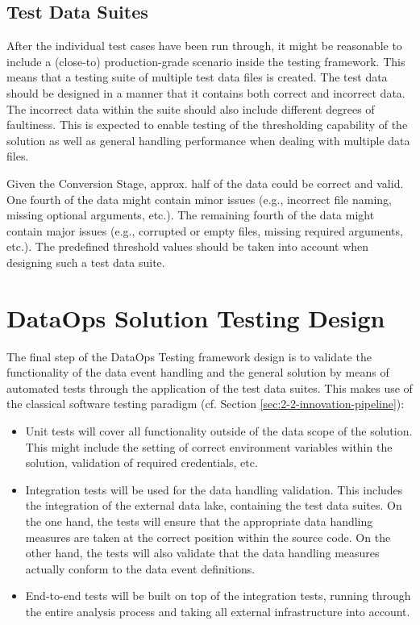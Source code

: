 \subsection{Test Data Suites} \label{sec:4-test-suites}
After the individual test cases have been run through, it might be reasonable to include a (close-to) production-grade scenario inside the testing framework. This means that a testing suite of multiple test data files is created. The test data should be designed in a manner that it contains both correct and incorrect data. The incorrect data within the suite should also include different degrees of faultiness. This is expected to enable testing of the thresholding capability of the solution as well as general handling performance when dealing with multiple data files.

Given the Conversion Stage, approx. half of the data could be correct and valid. One fourth of the data might contain minor issues (e.g., incorrect file naming, missing optional arguments, etc.). The remaining fourth of the data might contain major issues (e.g., corrupted or empty files, missing required arguments, etc.). The predefined threshold values should be taken into account when designing such a test data suite.


\section{DataOps Solution Testing Design}
The final step of the DataOps Testing framework design is to validate the functionality of the data event handling and the general solution by means of automated tests through the application of the test data suites. This makes use of the classical software testing paradigm (cf. Section \ref{sec:2-2-innovation-pipeline}):

\begin{itemize}
	\item Unit tests will cover all functionality outside of the data scope of the solution. This might include the setting of correct environment variables within the solution, validation of required credentials, etc.
	\item  Integration tests will be used for the data handling validation. This includes the integration of the external data lake, containing the test data suites. On the one hand, the tests will ensure that the appropriate data handling measures are taken at the correct position within the source code. On the other hand, the tests will also validate that the data handling measures actually conform to the data event definitions.
	\item  End-to-end tests will be built on top of the integration tests, running through the entire analysis process and taking all external infrastructure into account.
\end{itemize}
